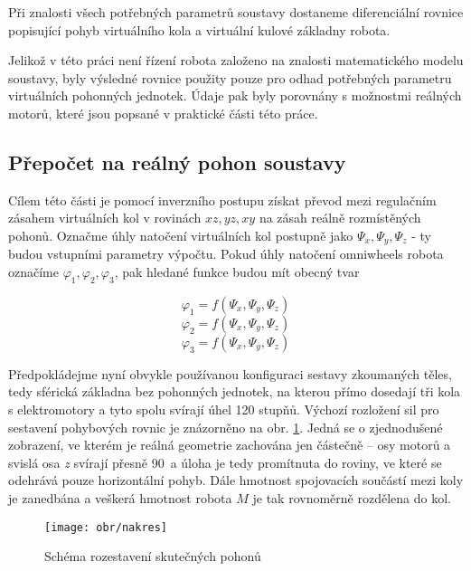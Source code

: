 Při znalosti všech potřebných parametrů soustavy dostaneme diferenciální rovnice popisující pohyb virtuálního kola a virtuální kulové základny robota.

Jelikož v této práci není řízení robota založeno na znalosti matematického modelu soustavy, byly výsledné rovnice použity pouze pro odhad potřebných parametru virtuálních pohonných jednotek. Údaje pak byly porovnány s možnostmi reálných motorů, které jsou popsané v praktické části této práce.

\subsection{Přepočet na reálný pohon soustavy}
\label{prepocet}

Cílem této části je pomocí inverzního postupu získat převod mezi regulačním zásahem virtuálních kol v rovinách $xz, yz, xy$ na zásah reálně rozmístěných pohonů. Označme úhly natočení virtuálních kol postupně jako $\Psi_{x}, \Psi_{y}, \Psi_{z}$ - ty budou vstupními parametry výpočtu. Pokud úhly natočení omniwheels robota označíme $\varphi_{1}, \varphi_{2}, \varphi_{3}$, pak hledané funkce budou mít obecný tvar

\begin{equation}
\varphi_{1}=f(\Psi_{x}, \Psi_{y}, \Psi_{z})
\end{equation}
\begin{equation}
\varphi_{2}=f(\Psi_{x}, \Psi_{y}, \Psi_{z})
\end{equation}
\begin{equation}
\varphi_{3}=f(\Psi_{x}, \Psi_{y}, \Psi_{z})
\end{equation}

Předpokládejme nyní obvykle používanou konfiguraci sestavy zkoumaných těles, tedy sférická základna bez pohonných jednotek, na kterou přímo dosedají tři kola s elektromotory a tyto spolu svírají úhel 120 stupňů. Výchozí rozložení sil pro sestavení pohybových rovnic je znázorněno na obr. \ref{nakres}. Jedná se o zjednodušené zobrazení, ve kterém je reálná geometrie zachována jen částečně -- osy motorů a svislá osa \textit z svírají přesně 90\textdegree \, a úloha je tedy promítnuta do roviny, ve které se odehrává pouze horizontální pohyb. Dále hmotnost spojovacích součástí mezi koly je zanedbána a veškerá hmotnost robota $M$ je tak rovnoměrně rozdělena do kol. 

\begin{figure}[htb]
\begin{center}
\texttt{[image: obr/nakres]}
\end{center}
\caption{Schéma rozestavení skutečných pohonů \cite{kuala}}
\label{nakres}
\end{figure}

